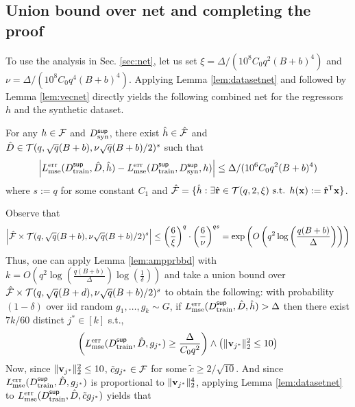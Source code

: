 \subsection{Union bound over net and completing the proof} \label{sec:unionbd}
To use the analysis in Sec. \ref{sec:net}, let us set $\xi= \Delta/(10^8 C_0 q^2 (B+b)^4)$ and $\nu = \Delta/(10^8 C_0 q^4 (B+b)^4)$. 
Applying Lemma \ref{lem:datasetnet} and followed by Lemma \ref{lem:vecnet} directly yields the following combined net for the regressors $h$ and the synthetic dataset.
\begin{lemma}\label{lem:combinedned}
For any $h\in \mathcal{F}$ and $D^{\sf sup}_{\textnormal{syn}}$, there exist $\hat{h} \in \hat{\mathcal{F}}$ and $\hat{D} \in \mathcal{T}(q, \sqrt{q}(B+b), \nu\sqrt{q}(B+b)/2)^s$ such that
\begin{equation}
    \left|L^{\textnormal{err}}_{\textnormal{mse}}(D^{\sf sup}_{\textnormal{train}}, \hat{D}, \hat{h}) - L^{\textnormal{err}}_{\textnormal{mse}}(D^{\sf sup}_{\textnormal{train}}, D^{\sf sup}_{\textnormal{syn}}, h)\right| \leq \Delta/(10^6 C_0 q^2(B+b)^4)
\end{equation}
where $s := q$ for some constant $C_1$ and $\hat{\mathcal{F}} = \{\hat{h} : \exists \hat{{\mathbf{r}}} \in \mathcal{T}(q, 2, \xi)\textnormal{ s.t. } h({\mathbf{x}}) := \hat{{\mathbf{r}}}^{\sf T}{\mathbf{x}}\}$.
\end{lemma}
Observe that 
\begin{equation}
    \left|\hat{\mathcal{F}} \times \mathcal{T}(q, \sqrt{q}(B+b), \nu\sqrt{q}(B+b)/2)^s\right| \leq \left(\frac{6}{\xi}\right)^q \cdot \left(\frac{6}{\nu}\right)^{qs} = \textnormal{exp}\left(O\left({q^2}\log\left(\frac{q(B+b)}{\Delta}\right)\right)\right) \nonumber
\end{equation}
Thus, one can apply Lemma \ref{lem:ampprbbd} with $k = O\left({q^2}\log\left(\frac{q(B+b)}{\Delta}\right)\log\left(\frac{1}{\delta}\right)\right)$ %
and take a union bound over $\hat{\mathcal{F}} \times \mathcal{T}(q, \sqrt{q}(B+d), \nu\sqrt{q}(B+b)/2)^s$ to obtain the following: with probability $(1-\delta)$ over iid random $g_1, \dots, g_k \sim G$, if $L^{\textnormal{err}}_{\textnormal{mse}}(D^{\sf sup}_{\textnormal{train}}, \hat{D}, \hat{h})  > \Delta$ then there exist $7k/60$ distinct $j^* \in [k]$ s.t.,  
\begin{equation}
    \left(L^{\textnormal{err}}_{\textnormal{mse}}(D^{\sf sup}_{\textnormal{train}}, \hat{D}, g_{j^*}) \geq \frac{\Delta}{C_0q^2}\right)\wedge \left(\|{\mathbf{v}}_{j^*}\|_2^2 \leq 10\right) 
\end{equation}
Now, since $\|{\mathbf{v}}_{j^*}\|_2^2 \leq 10$, $\tilde{c}g_{j^*} \in \mathcal{F}$ for some $\tilde{c} \geq 2/\sqrt{10}$. And since $L^{\textnormal{err}}_{\textnormal{mse}}(D^{\sf sup}_{\textnormal{train}}, \hat{D}, g_{j^*})$ is proportional to $\|{\mathbf{v}}_{j^*}\|_2^4$, applying Lemma \ref{lem:datasetnet} to $L^{\textnormal{err}}_{\textnormal{mse}}(D^{\sf sup}_{\textnormal{train}}, \hat{D}, \tilde{c} g_{j^*})$ yields that 
